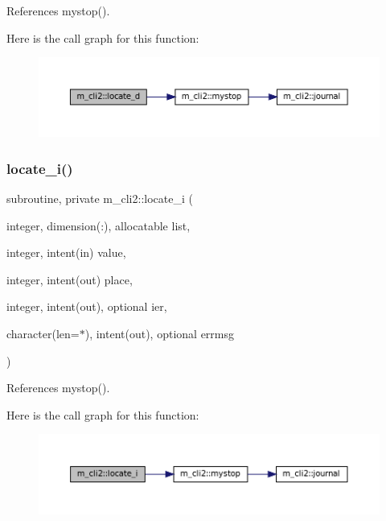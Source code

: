 References mystop().

Here is the call graph for this function\+:
\nopagebreak
\begin{figure}[H]
\begin{center}
\leavevmode
\includegraphics[width=350pt]{namespacem__cli2_a0e859cd8635ab617ea9a4e9b4ffca852_cgraph}
\end{center}
\end{figure}
\mbox{\label{namespacem__cli2_a3cc41a1a629f9ab278376a71b243673d}} 
\subsubsection{\texorpdfstring{locate\+\_\+i()}{locate\_i()}}
{\footnotesize\ttfamily subroutine, private m\+\_\+cli2\+::locate\+\_\+i (\begin{DoxyParamCaption}\item[{integer, dimension(\+:), allocatable}]{list,  }\item[{integer, intent(in)}]{value,  }\item[{integer, intent(out)}]{place,  }\item[{integer, intent(out), optional}]{ier,  }\item[{character(len=$\ast$), intent(out), optional}]{errmsg }\end{DoxyParamCaption})\hspace{0.3cm}{\ttfamily [private]}}



References mystop().

Here is the call graph for this function\+:
\nopagebreak
\begin{figure}[H]
\begin{center}
\leavevmode
\includegraphics[width=350pt]{namespacem__cli2_a3cc41a1a629f9ab278376a71b243673d_cgraph}
\end{center}
\end{figure}
\mbox{\label{namespacem__cli2_a2e12eb8c0ae6ce90b821141699e627df}} 
